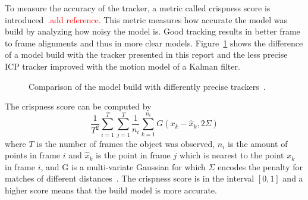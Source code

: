 \documentclass[twoside,a4paper,article]{combine}
\begin{document}
To measure the accuracy of the tracker, a metric called crispness
score is introduced~\cite{crispness}.\textcolor{red}{add reference.}
This metric measures how accurate the model was build by analyzing
how noisy the model is. Good tracking results in better frame to frame
alignments and thus in more clear
models. Figure~\ref{fig:good-bad-model} shows the difference of a
model build with the tracker presented in this report and the less
precise ICP tracker improved with the motion model of a Kalman filter.
\begin{figure}
  \center
  \caption{Comparison of the model build with differently precise trackers~\cite{paper}.}
  \label{fig:good-bad-model}
\end{figure}
The crispness score can be computed by
\begin{equation}
  \frac{1}{T^2}\sum_{i=1}^T\sum_{j=1}^T\frac{1}{n_i}\sum_{k=1}^{n_i}G(x_k-\hat{x}_k,2\Sigma)
\end{equation}
where $T$ is the number of frames the object was observed, $n_i$ is
the amount of points in frame $i$ and $\hat{x}_k$ is the point in
frame $j$ which is nearest to the point $x_k$ in frame $i$, and G is a
multi-variate Gaussian for which $\Sigma$ encodes the penalty for
matches of different distances~\cite{crispness,paper}. The crispness
score is in the interval $[0,1]$ and a higher score means that the
build model is more accurate.
\end{document}
